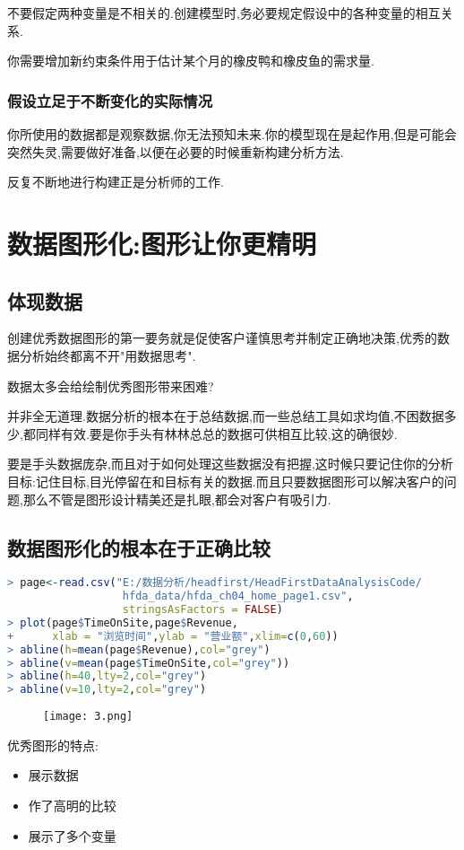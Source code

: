 \documentclass[11pt,a4paper,oneside]{book}
\begin{document}
\begin{tcolorbox}[colback=pink!10!white,colframe=pink!100!black]
不要假定两种变量是不相关的.创建模型时,务必要规定假设中的各种变量的相互关系.	
\end{tcolorbox}

你需要增加新约束条件用于估计某个月的橡皮鸭和橡皮鱼的需求量.

\subsection{假设立足于不断变化的实际情况}
你所使用的数据都是观察数据,你无法预知未来.你的模型现在是起作用,但是可能会突然失灵,需要做好准备,以便在必要的时候重新构建分析方法.

反复不断地进行构建正是分析师的工作.
\chapter{数据图形化:图形让你更精明}
\section{体现数据}
创建优秀数据图形的第一要务就是促使客户谨慎思考并制定正确地决策,优秀的数据分析始终都离不开"用数据思考".

\begin{tcolorbox}[colback=pink!10!white,colframe=pink!100!black]
数据太多会给绘制优秀图形带来困难?

并非全无道理.数据分析的根本在于总结数据,而一些总结工具如求均值,不困数据多少,都同样有效.要是你手头有林林总总的数据可供相互比较,这的确很妙.
\end{tcolorbox}
要是手头数据庞杂,而且对于如何处理这些数据没有把握,这时候只要记住你的分析目标:记住目标,目光停留在和目标有关的数据.而且只要数据图形可以解决客户的问题,那么不管是图形设计精美还是扎眼,都会对客户有吸引力.
\section{数据图形化的根本在于正确比较}
\begin{lstlisting}[language=r]
> page<-read.csv("E:/数据分析/headfirst/HeadFirstDataAnalysisCode/
                  hfda_data/hfda_ch04_home_page1.csv",
                  stringsAsFactors = FALSE)
> plot(page$TimeOnSite,page$Revenue,
+      xlab = "浏览时间",ylab = "营业额",xlim=c(0,60))
> abline(h=mean(page$Revenue),col="grey")
> abline(v=mean(page$TimeOnSite,col="grey"))
> abline(h=40,lty=2,col="grey")
> abline(v=10,lty=2,col="grey")
\end{lstlisting}
\begin{figure}[H]
	\centering
	\texttt{[image: 3.png]}  
\end{figure}
优秀图形的特点:
\begin{itemize}
	\item 展示数据
	\item 作了高明的比较
	\item 展示了多个变量
\end{itemize}
\end{document}
